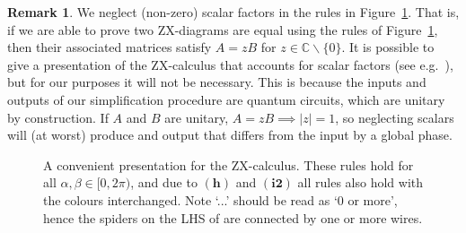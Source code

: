 \documentclass[a4paper,onecolumn,superscriptaddress,11pt,accepted=2020-04-27]{quantumarticle}
\makeatletter
\newcommand\ie{i.e.\@\xspace}  %
\theoremstyle{definition}
\newtheorem{remark}[theorem]{Remark}
\makeatother
\begin{document}
\begin{remark}
We neglect (non-zero) scalar factors in the rules in Figure~\ref{fig:zx-rules}. That is, if we are able to prove two ZX-diagrams are equal using the rules of Figure~\ref{fig:zx-rules}, then their associated matrices satisfy $A = zB$ for $z \in \mathbb C\backslash\{0\}$. It is possible to give a presentation of the ZX-calculus that accounts for scalar factors (see e.g.~\cite{Backens:2015aa}), but for our purposes it will not be necessary. This is because the inputs and outputs of our simplification procedure are quantum circuits, which are unitary by construction. If $A$ and $B$ are unitary, $A = zB \implies |z| = 1$, so neglecting scalars will (at worst) produce and output that differs from the input by a global phase.
\end{remark}

\begin{figure}%
\centering
\caption{
A convenient presentation for the ZX-calculus. These rules hold for all $\alpha, \beta \in [0, 2 \pi)$, and due to $(\bm{h})$ and $(\bm{i2})$ all rules also hold with the colours interchanged. Note `...' should be read as `0 or more', hence the spiders on the LHS of \SpiderRule are connected by one or more wires.}
\label{fig:zx-rules}
\end{figure}

\end{document}
